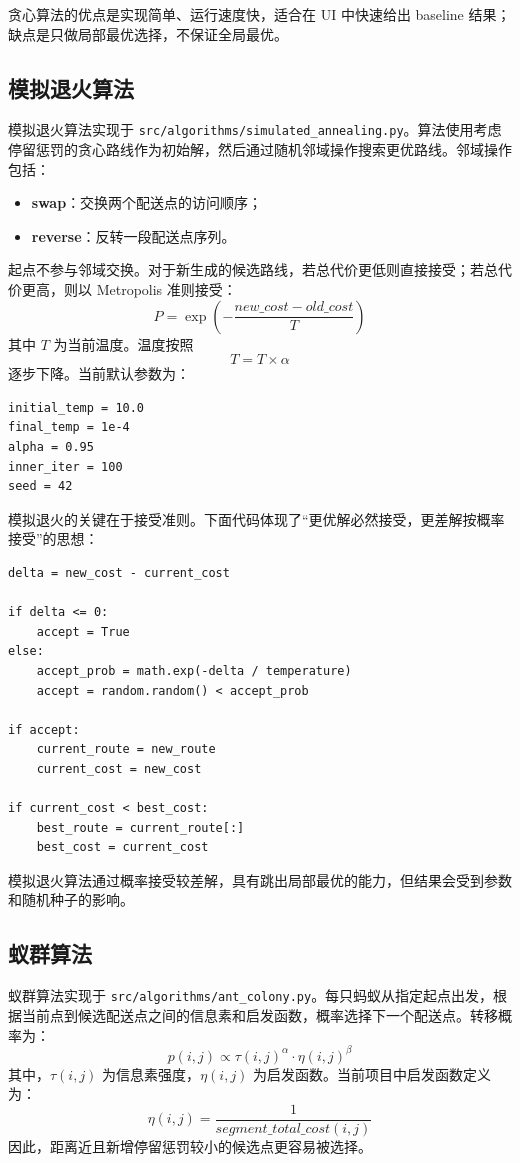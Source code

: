 \documentclass[12pt,a4paper,UTF8]{article}
\begin{document}
贪心算法的优点是实现简单、运行速度快，适合在 UI 中快速给出 baseline 结果；缺点是只做局部最优选择，不保证全局最优。

\subsection{模拟退火算法}

模拟退火算法实现于 \texttt{src/algorithms/simulated\_annealing.py}。算法使用考虑停留惩罚的贪心路线作为初始解，然后通过随机邻域操作搜索更优路线。邻域操作包括：
\begin{itemize}
    \item \textbf{swap}：交换两个配送点的访问顺序；
    \item \textbf{reverse}：反转一段配送点序列。
\end{itemize}

起点不参与邻域交换。对于新生成的候选路线，若总代价更低则直接接受；若总代价更高，则以 Metropolis 准则接受：
\[
    P=\exp\left(-\frac{new\_cost-old\_cost}{T}\right)
\]
其中 $T$ 为当前温度。温度按照
\[
    T = T \times \alpha
\]
逐步下降。当前默认参数为：
\begin{verbatim}
initial_temp = 10.0
final_temp = 1e-4
alpha = 0.95
inner_iter = 100
seed = 42
\end{verbatim}

模拟退火的关键在于接受准则。下面代码体现了“更优解必然接受，更差解按概率接受”的思想：

\begin{lstlisting}[caption={模拟退火 Metropolis 接受准则}]
delta = new_cost - current_cost

if delta <= 0:
    accept = True
else:
    accept_prob = math.exp(-delta / temperature)
    accept = random.random() < accept_prob

if accept:
    current_route = new_route
    current_cost = new_cost

if current_cost < best_cost:
    best_route = current_route[:]
    best_cost = current_cost
\end{lstlisting}

模拟退火算法通过概率接受较差解，具有跳出局部最优的能力，但结果会受到参数和随机种子的影响。

\subsection{蚁群算法}

蚁群算法实现于 \texttt{src/algorithms/ant\_colony.py}。每只蚂蚁从指定起点出发，根据当前点到候选配送点之间的信息素和启发函数，概率选择下一个配送点。转移概率为：
\[
    p(i,j) \propto \tau(i,j)^\alpha \cdot \eta(i,j)^\beta
\]
其中，$\tau(i,j)$ 为信息素强度，$\eta(i,j)$ 为启发函数。当前项目中启发函数定义为：
\[
    \eta(i,j)=\frac{1}{segment\_total\_cost(i,j)}
\]
因此，距离近且新增停留惩罚较小的候选点更容易被选择。
\end{document}
